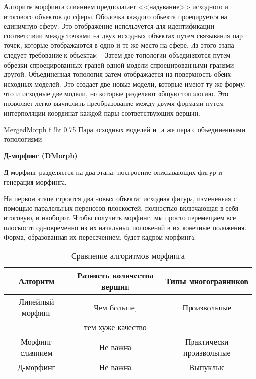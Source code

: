 Алгоритм морфинга слиянием предполагает <<надувание>> исходного и итогового объектов до сферы. Оболочка каждого объекта проецируется на единичную сферу. Это отображение используется для идентификации соответствий между точками на двух исходных объектах путем связывания пар точек, которые отображаются в одно и то же место на сфере. Из этого этапа следует требование к объектам --  Затем две топологии объединяются путем обрезки спроецированных граней одной модели спроецированными гранями другой. Объединенная топология затем отображается на поверхность обеих исходных моделей. Это создает две новые модели, которые имеют ту же форму, что и исходные две модели, но которые разделяют общую топологию. Это позволяет легко вычислить преобразование между двумя формами путем интерполяции координат каждой пары соответствующих вершин.~\cite{Merging_Morph}

{MergedMorph}
{f}
{!ht}
{0.75\textwidth}
{Пара исходных моделей и та же пара с объединенными топологиями}

\leavevmode

\textbf{Д-морфинг (DMorph)}

Д-морфинг разделяется на два этапа: построение описывающих фигур и генерация морфинга.

На первом этапе строятся два новых объекта: исходная фигура, измененная с помощью паралельных переносов плоскостей, полностью включающая в себя итоговую, и наоборот.  Чтобы получить морфинг, мы просто перемещаем все плоскости одновременно из их начальных положений в их конечные положения. Форма, образованная их пересечением, будет кадром морфинга.~\cite{DMorph}

\begin{table}[ht]
	\small
	\begin{center}
		\begin{threeparttable}
			\caption{Сравнение алгоритмов морфинга}
			\label{tbl:test_morph}
			\begin{tabular}{|c|c|c|}
				\hline
				\bfseries Алгоритм & \bfseries Разность количества вершин & \bfseries Типы многогранников \\
				\hline
				Линейный морфинг & Чем больше, & Произвольные \\
				& тем хуже качество & \\
				\hline
				Морфинг слиянием & Не важна & Практически произвольные \\
				\hline
				Д-морфинг & Не важна & Выпуклые \\
				\hline
			\end{tabular}
		\end{threeparttable}
	\end{center}
\end{table}

